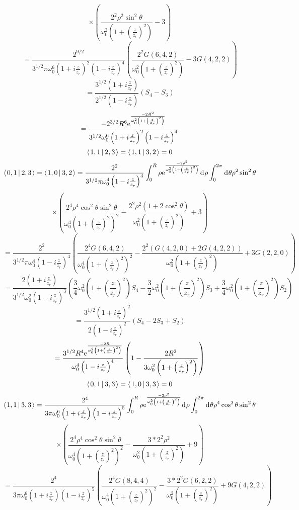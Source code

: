 \documentclass[11pt]{amsart}
\makeatletter
\newcommand{\e}{{\rm e}}				%
\newcommand{\msp}[1]{\mspace{#1mu}}		%
\newcommand{\0}{\varnothing}		%
\newcommand{\dd}{\msp{1} {\rm{d}} \msp{1}}	%
\newcommand{\brac}[2]{\left\langle\msp{2} #1\left\lvert \msp{3.5} #2 \right.\right\rangle}	%
\newcommand{\1}{!}
\newcommand{\2}{@}
\newcommand{\3}{\#}
\newcommand{\4}{\$}
\newcommand{\5}{\%}
\newcommand{\6}{$^\wedge$}
\newcommand{\7}{\&}
\newcommand{\8}{*}
\newcommand{\9}{(}
\makeatother
\begin{document}
\[
\times\left(\frac{2^2\rho^2\sin^2\theta}{\omega_0^2\left(1+\left(\frac{z}{z_r}\right)^2\right)}-3\right)
\]
\[
=\frac{2^{9/2}}{3^{1/2}\pi\omega_0^6\left(1+i\frac{z}{z_r}\right)^2\left(1-i\frac{z}{z_r}\right)^4}\left(\frac{2^2G(6,4,2)}{\omega_0^2\left(1+\left(\frac{z}{z_r}\right)^2\right)}-3G(4,2,2)\right)
\]
\[
=\frac{3^{1/2}\left(1+i\frac{z}{z_r}\right)}{2^{1/2}\left(1-i\frac{z}{z_r}\right)}\left(S_4-S_3\right)
\]
\[
=\frac{-2^{3/2}R^6\e^{\frac{-2R^2}{\omega_0^2\left(1+\left(\frac{z}{z_r}\right)^2\right)}}}{3^{1/2}\omega_0^6\left(1+i\frac{z}{z_r}\right)^2\left(1-i\frac{z}{z_r}\right)^4}
\]
\[
\brac{1,1}{2,3} =\brac{1,1}{3,2} = 0
\]
\[
\brac{0,1}{2,3} = \brac{1,0}{3,2} = \frac{2^2}{3^{1/2}\pi\omega_0^4\left(1-i\frac{z}{z_r}\right)^4}\int_0^R \rho \e^{\frac{-2\rho^2}{\omega_0^2\left(1+\left(\frac{z}{z_r}\right)^2\right)}}\dd \rho\int_0^{2\pi}\dd \theta\rho^2\sin^2\theta
\]
\[
\times\left(\frac{2^4\rho^4\cos^2\theta\sin^2\theta}{\omega_0^4\left(1+\left(\frac{z}{z_r}\right)^2\right)^2}-\frac{2^2\rho^2\left(1+2\cos^2\theta\right)}{\omega_0^2\left(1+\left(\frac{z}{z_r}\right)^2\right)}+3\right)
\]
\[
=\frac{2^2}{3^{1/2}\pi\omega_0^4\left(1-i\frac{z}{z_r}\right)^4}\left(\frac{2^4G(6,4,2)}{\omega_0^4\left(1+\left(\frac{z}{z_r}\right)^2\right)^2}-\frac{2^2\left(G(4,2,0)+2G(4,2,2)\right)}{\omega_0^2\left(1+\left(\frac{z}{z_r}\right)^2\right)}+3G(2,2,0)\right)
\]
\[
=\frac{2\left(1+i\frac{z}{z_r}\right)}{3^{1/2}\omega_0^2\left(1-i\frac{z}{z_r}\right)^3}\left(\frac{3}{4}\omega_0^2\left(1+\left(\frac{z}{z_r}\right)^2\right)S_4-\frac{3}{2}\omega_0^2\left(1+\left(\frac{z}{z_r}\right)^2\right)S_3+\frac{3}{4}\omega_0^2\left(1+\left(\frac{z}{z_r}\right)^2\right)S_2\right)
\]
\[
=\frac{3^{1/2}\left(1+i\frac{z}{z_r}\right)^2}{2\left(1-i\frac{z}{z_r}\right)^2}\left(S_4-2S_3+S_2\right)
\]
\[
=\frac{3^{1/2}R^4\e^{\frac{-2R}{\omega_0^2\left(1+\left(\frac{z}{z_r}\right)^2\right)}}}{\omega_0^4\left(1-i\frac{z}{z_r}\right)^4}\left(1-\frac{2R^2}{3\omega_0^2\left(1+\left(\frac{z}{z_r}\right)^2\right)}\right)
\]
\[
\brac{0,1}{3,3} = \brac{1,0}{3,3} = 0
\]\newpage
\[
\brac{1,1}{3,3} = \frac{2^4}{3\pi\omega_0^6\left(1+i\frac{z}{z_r}\right)\left(1-i\frac{z}{z_r}\right)^5}\int_0^R\rho \e^{\frac{-2\rho^2}{\omega_0^2\left(1+\left(\frac{z}{z_r}\right)^2\right)}}\dd \rho\int_0^{2\pi} \dd \theta \rho^4 \cos^2\theta\sin^2 \theta
\]
\[
\times\left(\frac{2^4\rho^4\cos^2\theta\sin^2\theta}{\omega_0^4\left(1+\left(\frac{z}{z_r}\right)^2\right)^2}-\frac{3*2^2\rho^2}{\omega_0^2\left(1+\left(\frac{z}{z_r}\right)^2\right)}+9\right)
\]
\[
=\frac{2^4}{3\pi\omega_0^6\left(1+i\frac{z}{z_r}\right)\left(1-i\frac{z}{z_r}\right)^5}\left(\frac{2^4G(8,4,4)}{\omega_0^4\left(1+\left(\frac{z}{z_r}\right)^2\right)^2}-\frac{3*2^2G(6,2,2)}{\omega_0^2\left(1+\left(\frac{z}{z_r}\right)^2\right)}+9G(4,2,2)\right)
\]
\end{document}
